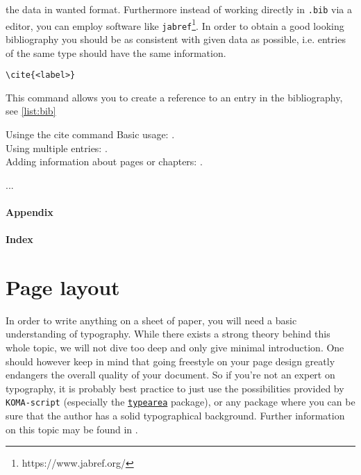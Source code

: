 the data in wanted format. Furthermore instead of working directly in \texttt{.bib} 
via a editor, you can employ software like \texttt{jabref}\footnote{https://www.jabref.org/}. 
In order to obtain a good looking bibliography you should be as consistent with given 
data as possible, i.e. entries of the same type should have the same information.
\begin{emphBox}
\lstinline|\cite{<label>}|
\end{emphBox}
This command allows you to create a reference to an entry in the bibliography, 
see \cref{list:bib}
\begin{lstbox}[label=list:bib]{Usinge the cite command}
Basic usage: \cite{Evans15}.\\
Using multiple entries: \cite{Evans15, Kantorovich06}.\\
Adding information about pages or chapters: \cite[P. 87]{Evans15}.
\end{lstbox}
...\par
\paragraph{Appendix}
\kant
\par
\paragraph{Index}
\kant
\par
\section{Page layout}\label{sec:pagelay}
In order to write anything on a sheet of paper, you will need a basic understanding 
of typography. While there exists a strong theory behind this whole topic, we will 
not dive too deep and only give minimal introduction. One should however keep in mind that 
going freestyle on your page design greatly endangers the overall quality of your document. 
So if you're not an expert on typography, it is probably best practice to just use the 
possibilities provided by \texttt{KOMA-script} 
(especially the \href{https://ctan.org/pkg/enumitem}{\texttt{typearea}} package), 
or any package where you can be sure that 
the author has a solid typographical background. Further information on this topic may be 
found in \cite{Tschichold75, Willberg99}.
